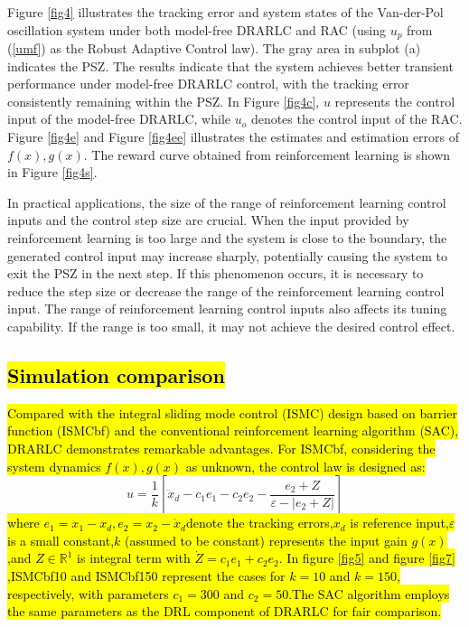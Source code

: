 \documentclass[preprint,12pt]{elsarticle}
\begin{document}
Figure \ref{fig4} illustrates the tracking error and system states of the Van-der-Pol oscillation system under both model-free DRARLC and RAC (using $u_p$ from (\ref{umf}) as the Robust Adaptive Control law). The gray area in subplot (a) indicates the PSZ. The results indicate that the system achieves better transient performance under model-free DRARLC control, with the tracking error consistently remaining within the PSZ. In Figure \ref{fig4c}, $u$ represents the control input of the model-free DRARLC, while $u_o$ denotes the control input of the RAC. Figure \ref{fig4e} and Figure \ref{fig4ee} illustrates the estimates and estimation errors of \(f(x),g(x)\). The reward curve obtained from reinforcement learning is shown in Figure \ref{fig4s}.

\begin{rmk}
    In practical applications, the size of the range of reinforcement learning control inputs and the control step size are crucial. When the input provided by reinforcement learning is too large and the system is close to the boundary, the generated control input may increase sharply, potentially causing the system to exit the PSZ in the next step. If this phenomenon occurs, it is necessary to reduce the step size or decrease the range of the reinforcement learning control input. The range of reinforcement learning control inputs also affects its tuning capability. If the range is too small, it may not achieve the desired control effect.
\end{rmk}

\subsection{\hl{Simulation comparison}}

\hl{Compared with the integral sliding mode control (ISMC) design based on barrier function (ISMCbf) and the conventional reinforcement learning algorithm (SAC), DRARLC demonstrates remarkable advantages. For ISMCbf, considering the system dynamics $f(x),g(x)$ as unknown, the control law is designed as\cite{wevj15010017}:}
\[
    u = \frac{1}{k}\left[ \ddot{x}_d - c_1 e_1 - c_2 e_2 - \frac{e_2 + Z}{\varepsilon - |e_2 + Z|} \right]
\]
\hl{where $e_1 = x_1 - x_d,e_2 = x_2 - \dot{x}_d$denote the tracking errors,$x_d$ is reference input,$\varepsilon$ is a small constant,$k$ (assumed to be constant) represents the input gain $g(x)$ ,and $Z \in \mathbb{R}^1$ is integral term with $\dot{Z} = c_1 e_1 + c_2 e_2$. In figure \ref{fig5} and figure \ref{fig7}  ,ISMCbf10 and ISMCbf150 represent the cases for $k=10$ and $k=150$, respectively, with parameters $c_1 =300$ and $c_2 = 50$.The SAC algorithm employs the same parameters as the DRL component of DRARLC for fair comparison.}
\end{document}
